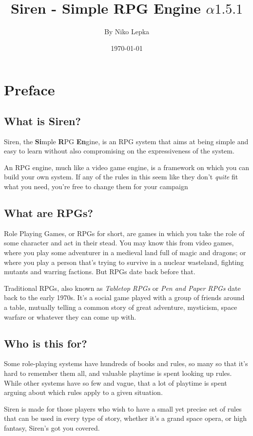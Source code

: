 \documentclass[a4paper]{book}
\title{Siren - Simple RPG Engine $\alpha1.5.1$}
\author{By Niko Lepka}
\date{\today}
\begin{document}
\maketitle

\chapter*{Preface}
\section*{What is Siren?}
Siren, the \textbf{Si}mple \textbf{R}PG \textbf{En}gine, is an RPG system that aims at being simple and easy to learn without also compromising on the expressiveness of the system.

An RPG engine, much like a video game engine, is a framework on which you can build your own system. If any of the rules in this seem like they don't \textit{quite} fit what you need, you're free to change them for your campaign

\section*{What are RPGs?}
Role Playing Games, or RPGs for short, are games in which you take the role of some character and act in their stead.
You may know this from video games, where you play some adventurer in a medieval land full of magic and dragons; or where you play a person that's trying to survive in a nuclear wasteland, fighting mutants and warring factions.
But RPGs date back before that.

Traditional RPGs, also known as \textit{Tabletop RPGs} or \textit{Pen and Paper RPGs} date back to the early 1970s.
It's a social game played with a group of friends around a table, mutually telling a common story of great adventure, mysticism, space warfare or whatever they can come up with.

\section*{Who is this for?}
Some role-playing systems have hundreds of books and rules, so many so that it's hard to remember them all, and valuable playtime is spent looking up rules. 
While other systems have so few and vague, that a lot of playtime is spent arguing about which rules apply to a given situation.

Siren is made for those players who wish to have a small yet precise set of rules that can be used in every type of story, whether it's a grand space opera, or high fantasy, Siren's got you covered.
\end{document}
